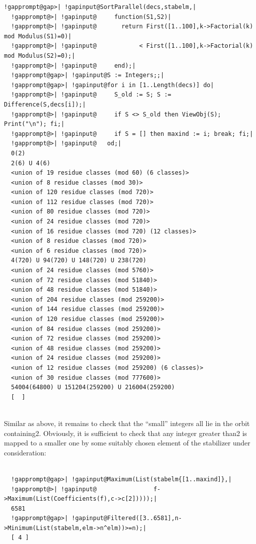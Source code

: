 \documentclass[a4paper,11pt]{report}
\begin{document}
{{\begin{Verbatim}[commandchars=!@|,fontsize=\small,frame=single,label=Example]
  !gapprompt@gap>| !gapinput@SortParallel(decs,stabelm,|
  !gapprompt@>| !gapinput@     function(S1,S2)|
  !gapprompt@>| !gapinput@       return First([1..100],k->Factorial(k) mod Modulus(S1)=0)|
  !gapprompt@>| !gapinput@            < First([1..100],k->Factorial(k) mod Modulus(S2)=0);|
  !gapprompt@>| !gapinput@     end);|
  !gapprompt@gap>| !gapinput@S := Integers;;|
  !gapprompt@gap>| !gapinput@for i in [1..Length(decs)] do|
  !gapprompt@>| !gapinput@     S_old := S; S := Difference(S,decs[i]);|
  !gapprompt@>| !gapinput@     if S <> S_old then ViewObj(S); Print("\n"); fi;|
  !gapprompt@>| !gapinput@     if S = [] then maxind := i; break; fi;|
  !gapprompt@>| !gapinput@   od;|
  0(2)
  2(6) U 4(6)
  <union of 19 residue classes (mod 60) (6 classes)>
  <union of 8 residue classes (mod 30)>
  <union of 120 residue classes (mod 720)>
  <union of 112 residue classes (mod 720)>
  <union of 80 residue classes (mod 720)>
  <union of 24 residue classes (mod 720)>
  <union of 16 residue classes (mod 720) (12 classes)>
  <union of 8 residue classes (mod 720)>
  <union of 6 residue classes (mod 720)>
  4(720) U 94(720) U 148(720) U 238(720)
  <union of 24 residue classes (mod 5760)>
  <union of 72 residue classes (mod 51840)>
  <union of 48 residue classes (mod 51840)>
  <union of 204 residue classes (mod 259200)>
  <union of 144 residue classes (mod 259200)>
  <union of 120 residue classes (mod 259200)>
  <union of 84 residue classes (mod 259200)>
  <union of 72 residue classes (mod 259200)>
  <union of 48 residue classes (mod 259200)>
  <union of 24 residue classes (mod 259200)>
  <union of 12 residue classes (mod 259200) (6 classes)>
  <union of 30 residue classes (mod 777600)>
  54004(64800) U 151204(259200) U 216004(259200)
  [  ]
  
\end{Verbatim}
 Similar as above, it remains to check that the ``small'' integers all lie in the orbit containing{\nobreakspace}2. Obviously, it is
sufficient to check that any integer greater than{\nobreakspace}2 is mapped to
a smaller one by some suitably chosen element of the stabilizer under
consideration: 
\begin{Verbatim}[commandchars=!@|,fontsize=\small,frame=single,label=Example]
  
  !gapprompt@gap>| !gapinput@Maximum(List(stabelm{[1..maxind]},|
  !gapprompt@>| !gapinput@                f->Maximum(List(Coefficients(f),c->c[2]))));|
  6581
  !gapprompt@gap>| !gapinput@Filtered([3..6581],n->Minimum(List(stabelm,elm->n^elm))>=n);|
  [ 4 ]
  

\end{Verbatim}}}
\end{document}
